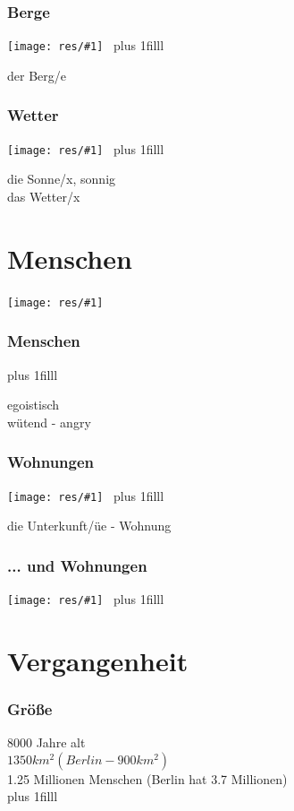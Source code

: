 \documentclass[t]{beamer} %
\newcommand{\toBottom}{\vskip0pt plus 1filll}
\newenvironment{newWords}
               {\toBottom \begin{block}{} \begin{tiny}}
               {\end{tiny} \end{block}}
\newcommand{\bigPic} [1] {\noindent \texttt{[image: res/\#1]}~}
\begin{document}
\begin{frame}
\frametitle{Berge}
\bigPic{sofia}
\begin{newWords}
der Berg/e \\
\end{newWords}
\end{frame}

\begin{frame}
\frametitle{Wetter}
\bigPic{weather}
\begin{newWords}
die Sonne/x, sonnig \\
das Wetter/x \\
\end{newWords}
\end{frame}

\section{Menschen}
\begin{frame}
\bigPic{angry}
\frametitle{Menschen}
\begin{newWords}
egoistisch \\
wütend - angry \\
\end{newWords}
\end{frame}

\begin{frame}
\frametitle{Wohnungen}
\bigPic{panelka}
\begin{newWords}
die Unterkunft/üe - Wohnung
\end{newWords}
\end{frame}

\begin{frame}
\frametitle{... und Wohnungen}
\bigPic{mladost3}
\begin{newWords}
\end{newWords}
\end{frame}

\section{Vergangenheit}
\begin{frame}
\frametitle{Größe}
8000 Jahre alt \\
$1350km^2 (Berlin - 900km^2)$ \\
1.25 Millionen Menschen (Berlin hat 3.7 Millionen) \\
\begin{newWords}
\end{newWords}
\end{frame}
\end{document}
